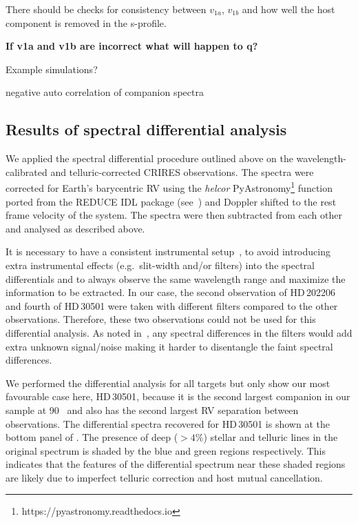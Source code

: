 There should be checks for consistency between \(v_{1a}\), \(v_{1b}\) and how well the host component is removed in the s-profile.

\textbf{If v1a and v1b are incorrect what will happen to q?}



Example simulations?

negative auto correlation of companion spectra 

\subsection{Results of spectral differential analysis}
\label{subsec:differential_results}

We applied the spectral differential procedure outlined above on the wavelength-calibrated and telluric-corrected {CRIRES} observations. The spectra were corrected for Earth's barycentric {RV} using the \emph{helcor} PyAstronomy\footnote{https://pyastronomy.readthedocs.io} function ported from the REDUCE IDL package (see~\citet[][]{piskunov_new_2002}) and Doppler shifted to the rest frame velocity of the system. The spectra were then subtracted from each other and analysed as described above.

It is necessary to have a consistent instrumental setup~\citet{ferluga_separating_1997}, to avoid introducing extra instrumental effects (e.g.\ slit-width and/or filters) into the spectral differentials and to always observe the same wavelength range and maximize the information to be extracted. In our case, the second observation of {HD\,202206} and fourth of {HD\,30501} were taken with different filters compared to the other observations. Therefore, these two observations could not be used for this differential analysis. As noted in~\citep{hadrava_disentangling_2009}, any spectral differences in the filters would add extra unknown signal/noise making it harder to disentangle the faint spectral differences.


We performed the differential analysis for all targets but only show our most favourable case here, {HD\,30501}, because it is the second largest companion in our sample at 90~\Mjup{} and also has the second largest {RV} separation between observations. The differential spectra recovered for {HD\,30501} is shown at the bottom panel of . The presence of deep (\(>4\%\)) stellar and telluric lines in the original spectrum is shaded by the blue and green regions respectively. This indicates that the features of the differential spectrum near these shaded regions are likely due to imperfect telluric correction and host mutual cancellation.

